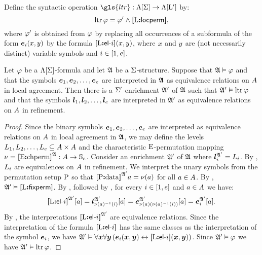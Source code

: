 \begin{definition}
Define the syntactic operation $\gls{ltr} : \aLF\SigS \to \aLF\LSp$
by:
\[
  \operatorname{ltr}\varphi = {\varphi'} \land {\bm{[}{\mathrm{L}}\mathord{\bm{:}}\mathsf{locperm}\bm{]}},
\]
where ${\varphi'}$ is obtained from $\varphi$ by replacing all occurrences of a
subformula of the form $\bm{e}_{i}(x,y)$ by the formula ${\bm{[}{\mathrm{L}}\mathord{\bm{:}}\mathsf{el}{\hbox{-}}i\bm{]}}(x,y)$, 
where $x$ and $y$ are (not necessarily distinct) variable symbols and
$i \in [1,e]$.
\end{definition}
\begin{remark}
Let $\varphi$ be a $\Lambda[\mathrm{\Sigma}]$-formula and let $\mathfrak{A}$ be a $\mathrm{\Sigma}$-structure.
Suppose that $\mathfrak{A} \vDash \varphi$ and that the symbols 
$\bm{e}_{1}, \bm{e}_{2}, \dots, \bm{e}_{e}$ are interpreted in $\mathfrak{A}$ as equivalence
relations on $A$ in local agreement.
Then there is a $\mathrm{\Sigma'}$-enrichment $\mathfrak{A'}$ of $\mathfrak{A}$ such that
$\mathfrak{A'} \vDash \operatorname{ltr}\varphi$ and that the symbols 
$\bm{l}_{1}, \bm{l}_{2}, \dots, \bm{l}_{e}$ are interpreted in $\mathfrak{A'}$ as equivalence
relations on $A$ in refinement.
\end{remark}
\begin{proof}
Since the binary symbols $\bm{e}_{1}, \bm{e}_{2}, \dots, \bm{e}_{e}$ are interpreted as
equivalence relations on $A$ in local agreement in $\mathfrak{A}$, we may define
the levels $L_{1}, L_{2}, \dots, L_{e} \subseteq {A\times A}$
and the characteristic ${\mathrm{E}}$-permutation mapping 
$\nu = {\bm{[}{\mathrm{E}}\mathord{\bm{:}}\mathrm{chperm}\bm{]}}^{\mathfrak{A}} : A \to \mathbb{S}_{e}$.
Consider an enrichment $\mathfrak{A'}$ of $\mathfrak{A}$ where 
$\bm{l}_{i}^{\mathfrak{A'}} = L_{i}$.
By , $L_{i}$ are equivalences on $A$ in
refinement.
We interpret the unary symbols from the
permutation setup ${\mathrm{P}}$ so that ${\bm{[}{\mathrm{P}}\mathord{\bm{:}}\mathrm{data}\bm{]}}^{\mathfrak{A'}}a = \nu(a)$ for all
$a \in A$.
By , $\mathfrak{A'} \vDash {\bm{[}{\mathrm{L}}\mathord{\bm{:}}\mathsf{fixperm}\bm{]}}$.
By , followed by ,
for every $i \in [1,e]$ and $a \in A$ we have:
\[
  {\bm{[}{\mathrm{L}}\mathord{\bm{:}}\mathsf{el}{\hbox{-}}i\bm{]}}^{\mathfrak{A'}}[a] =
  \bm{l}_{\nu(a)^{-1}(i)}^{\mathfrak{A'}}[a] =
  \bm{e}_{\nu(a)(\nu(a)^{-1}(i))}^{\mathfrak{A'}}[a] =
  \bm{e}_{i}^{\mathfrak{A'}}[a].
\]
By , the interpretations ${\bm{[}{\mathrm{L}}\mathord{\bm{:}}\mathsf{el}{\hbox{-}}i\bm{]}}^{\mathfrak{A'}}$ are
equivalence relations. Since the interpretation of the formula
${\bm{[}{\mathrm{L}}\mathord{\bm{:}}\mathsf{el}{\hbox{-}}i\bm{]}}$ has the same classes as the interpretation of the symbol $\bm{e}_{i}$,
we have $\mathfrak{A'} \vDash \forall\bm{x} \forall\bm{y}
\left(\bm{e}_{i}(\bm{x},\bm{y}) \leftrightarrow {\bm{[}{\mathrm{L}}\mathord{\bm{:}}\mathsf{el}{\hbox{-}}i\bm{]}}(\bm{x},\bm{y})\right)$.
Since $\mathfrak{A'} \vDash \varphi$ we have $\mathfrak{A'} \vDash \operatorname{ltr}\varphi$.
\end{proof}

